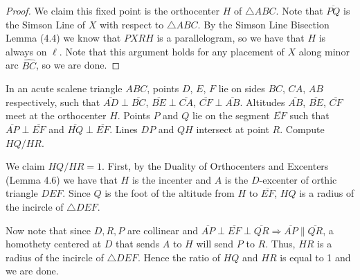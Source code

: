 \documentclass[letterpaper,oneside]{scrartcl}
\providecommand{\ol}{\overline}
\begin{document}
\begin{proof}
  We claim this fixed point is the orthocenter $H$ of \(\triangle ABC\). Note that \(\ol{PQ}\) is the Simson Line of \(X\) with respect to \(\triangle ABC\). By the Simson Line Bisection Lemma (4.4) we know that \(PXRH\) is a parallelogram, so we have that \(H\) is always on \(\ell\). Note that this argument holds for any placement of $X$ along minor arc $\widehat{BC}$, so we are done.
\end{proof}
\begin{problem*}
  In an acute scalene triangle $ABC$, points $D$, $E$, $F$ lie on sides $BC$, $CA$, $AB$ respectively, such that $\overline{AD} \perp \overline{BC}$, $\overline{BE} \perp \overline{CA}$, $\overline{CF} \perp \overline{AB}$. Altitudes $\overline{AB}$, $\overline{BE}$, $\overline{CF}$ meet at the orthocenter $H$. Points $P$ and $Q$ lie on the segment $\overline{EF}$ such that $\overline{AP} \perp \overline{EF}$ and $\overline{HQ} \perp \overline{EF}$. Lines $DP$ and $QH$ intersect at point $R$. Compute $HQ/HR$.
\end{problem*}
\begin{soln}
  We claim \(HQ/HR = 1\). First, by the Duality of Orthocenters and Excenters (Lemma 4.6) we have that \(H\) is the incenter and \(A\) is the \(D\)-excenter of orthic triangle \(DEF\). Since \(Q\) is the foot of the altitude from \(H\) to \(\ol{EF}\), \(HQ\) is a radius of the incircle of \(\triangle DEF\). 
  
  Now note that since \(D,R,P\) are collinear and \(\ol{AP} \perp \ol{EF} \perp \ol{QR} \Longrightarrow \ol{AP} \parallel \ol{QR}\), a homothety centered at \(D\) that sends \(A\) to \(H\) will send \(P\) to \(R\). Thus, \(HR\) is a radius of the incircle of \(\triangle DEF\). Hence the ratio of \(HQ\) and \(HR\) is equal to 1 and we are done.
\end{soln}
\end{document}
